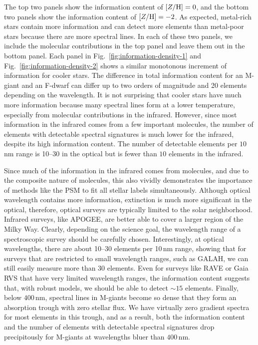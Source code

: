 \documentclass[iop]{emulateapj}
\begin{document}
\begin{CJK*}{UTF8}{gbsn}
The top two panels show the information content of $[Z/{\rm H}] = 0$, and the bottom two panels show the information content of $[Z/{\rm H}] = -2$. As expected, metal-rich stars contain more information and can detect more elements than metal-poor stars because there are more spectral lines. In each of these two panels, we include the molecular contributions in the top panel and leave them out in the bottom panel. Each panel in Fig.~\ref{fig:information-density-1} and Fig.~\ref{fig:information-density-2} shows a similar monotonous increment of information for cooler stars. The difference in total information content for an M-giant and an F-dwarf can differ up to two orders of magnitude and 20 elements depending on the wavelength. It is not surprising that cooler stars have much more information because many spectral lines form at a lower temperature, especially from molecular contributions in the infrared. However, since most information in the infrared comes from a few important molecules, the number of elements with detectable spectral signatures is much lower for the infrared, despite its high information content. The number of detectable elements per $10\,$nm range is 10--30 in the optical but is fewer than $10$ elements in the infrared. 

Since much of the information in the infrared comes from molecules, and due to the composite nature of molecules, this also vividly demonstrates the importance of methods like the PSM to fit all stellar labels simultaneously. Although optical wavelength contains more information, extinction is much more significant in the optical, therefore, optical surveys are typically limited to the solar neighborhood. Infrared surveys, like APOGEE, are better able to cover a larger region of the Milky Way. Clearly, depending on the science goal, the wavelength range of a spectroscopic survey should be carefully chosen. Interestingly, at optical wavelengths, there are about 10--30 elements per 10$\,$nm range, showing that for surveys that are restricted to small wavelength ranges, such as GALAH, we can still easily measure more than 30 elements. Even for surveys like RAVE or Gaia RVS that have very limited wavelength ranges, the information content suggests that, with robust models, we should be able to detect $\sim 15$ elements. Finally, below $400\,$nm, spectral lines in M-giants become so dense that they form an absorption trough with zero stellar flux. We have virtually zero gradient spectra for most elements in this trough, and as a result, both the information content and the number of elements with detectable spectral signatures drop precipitously for M-giants at wavelengths bluer than $400\,$nm.


\end{CJK*}
\end{document}
